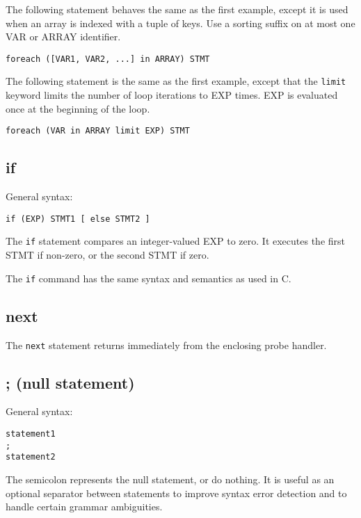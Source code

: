 \documentclass[twoside,english]{article}
\newenvironment{vindent}
{\begin{list}{}{\setlength{\listparindent}{6pt}}
\item[]}
{\end{list}}
\begin{document}
The following statement behaves the same as the first example, except it
is used when an array is indexed with a tuple of keys.  Use a sorting suffix
on at most one VAR or ARRAY identifier.

\begin{vindent}
\begin{verbatim}
foreach ([VAR1, VAR2, ...] in ARRAY) STMT
\end{verbatim}
\end{vindent}
The following statement is the same as the first example, except that the
\texttt{limit} keyword limits the number of loop iterations to EXP times.
EXP is evaluated once at the beginning of the loop.

\begin{vindent}
\begin{verbatim}
foreach (VAR in ARRAY limit EXP) STMT
\end{verbatim}
\end{vindent}

\subsection{if}
General syntax:

\begin{vindent}
\begin{verbatim}
if (EXP) STMT1 [ else STMT2 ]
\end{verbatim}
\end{vindent}
The \texttt{if} statement compares an integer-valued EXP to zero. It executes
the first STMT if non-zero, or the second STMT if zero.

The \texttt{if} command has the same syntax and semantics as used in C.


\subsection{next}
The \texttt{next} statement returns immediately from the enclosing probe
handler.


\subsection{; (null statement)}
\index{;}
General syntax:

\begin{vindent}
\begin{verbatim}
statement1
;
statement2
\end{verbatim}
\end{vindent}
The semicolon represents the null statement, or do nothing. It is useful
as an optional separator between statements to improve syntax error detection
and to handle certain grammar ambiguities.
\end{document}

